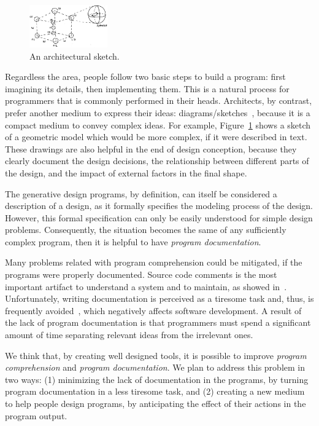 \begin{figure}[h]
	\centering
    \includegraphics[width=0.3\textwidth]{images/cube-sketch}
    \caption{An architectural sketch.}
    \label{fig:sketch}
\end{figure}

Regardless the area, people follow two basic steps to build a program: first imagining its details, then implementing them. This is a natural process for programmers that is commonly performed in their heads. Architects, by contrast, prefer another medium to express their ideas: diagrams/sketches~\cite{do2001thinking}, because it is a compact medium to convey complex ideas. For example, Figure~\ref{fig:sketch} shows a sketch of a geometric model which would be more complex, if it were described in text. These drawings are also helpful in the end of design conception, because they clearly document the design decisions, the relationship between different parts of the design, and the impact of external factors in the final shape.

The generative design programs, by definition, can itself be considered a description of a design, as it formally specifies the modeling process of the design. However, this formal specification can only be easily understood for simple design problems. Consequently, the situation becomes the same of any sufficiently complex program, then it is helpful to have \textit{program documentation}.

Many problems related with program comprehension could be mitigated, if the programs were properly documented. Source code comments is the most important artifact to understand a system and to maintain, as showed in~\cite{de2005study}. Unfortunately, writing documentation is perceived as a tiresome task and, thus, is frequently avoided~\cite{sousa1998survey}, which negatively affects software development. A result of the lack of program documentation is that programmers must spend a significant amount of time separating relevant ideas from the irrelevant ones.

We think that, by creating well designed tools, it is possible to improve \textit{program comprehension} and \textit{program documentation}. We plan to address this problem in two ways: (1) minimizing the lack of documentation in the programs, by turning program documentation in a less tiresome task, and (2) creating a new medium to help people design programs, by anticipating the effect of their actions in the program output.

